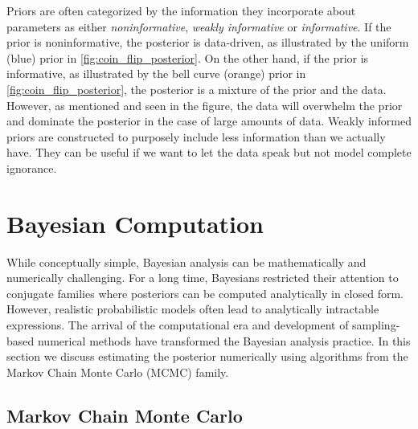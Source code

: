 Priors are often categorized by the information they incorporate about parameters as either \textit{noninformative}, \textit{weakly informative} or \textit{informative}. If the prior is noninformative, the posterior is data-driven, as illustrated by the uniform (blue) prior in \autoref{fig:coin_flip_posterior}. On the other hand, if the prior is informative, as illustrated by the bell curve (orange) prior in \autoref{fig:coin_flip_posterior}, the posterior is a mixture of the prior and the data. However, as mentioned and seen in the figure, the data will overwhelm the prior and dominate the posterior in the case of large amounts of data. Weakly informed priors are constructed to purposely include less information than we actually have. They can be useful if we want to let the data speak but not model complete ignorance.



\section{Bayesian Computation}

While conceptually simple, Bayesian analysis can be mathematically and numerically challenging. For a long time, Bayesians restricted their attention to conjugate families where posteriors can be computed analytically in closed form. However, realistic probabilistic models often lead to analytically intractable expressions. The arrival of the computational era and development of sampling-based numerical methods have transformed the Bayesian analysis practice. In this section we discuss estimating the posterior numerically using algorithms from the Markov Chain Monte Carlo (MCMC) family. 


\subsection{Markov Chain Monte Carlo}

